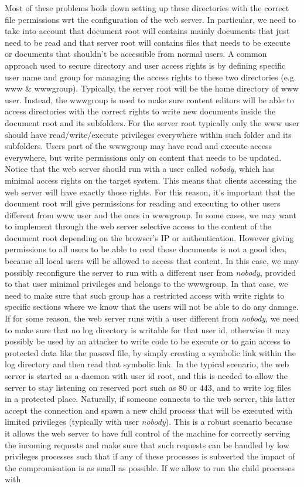Most of these problems boils down setting up these directories with the correct file permissions wrt the configuration of the web server. In particular, we need to take into account that document root will contains mainly documents that just need to be read and that server root will contains files that needs to be execute or documents that shouldn't be accessible from normal users. A common approach used to secure directory and user access rights is by defining specific user name and group for managing the access rights to these two directories (e.g. www \& wwwgroup). Typically, the server root will be the home directory of www user. Instead, the wwwgroup is used to make sure content editors will be able to access directories with the correct rights to write new documents inside the document root and its subfolders. For the server root typically only the www user should have read/write/execute privileges everywhere within such folder and its subfolders. Users part of the wwwgroup may have read and execute access everywhere, but write permissions only on content that needs to be updated. Notice that the web server should run with a user called \textit{nobody}, which has minimal access rights on the target system. This means that clients accessing the web server will have exactly those rights. For this reason, it's important that the document root will give permissions for reading and executing to other users different from www user and the ones in wwwgroup. In some cases, we may want to implement through the web server selective access to the content of the document root depending on the browser's IP or authentication. However giving permissions to all users to be able to read those documents is not a good idea, because all local users will be allowed to access that content. In this case, we may possibly reconfigure the server to run with a different user from \textit{nobody}, provided to that user minimal privileges and belongs to the wwwgroup. In that case, we need to make sure that such group has a restricted access with write rights to specific sections where we know that the users will not be able to do any damage. If for some reason, the web server runs with a user different from \textit{nobody}, we need to make sure that no log directory is writable for that user id, otherwise it may possibly be used by an attacker to write code to be execute or to gain access to protected data like the passwd file, by simply creating a symbolic link within the log directory and then read that symbolic link. In the typical scenario, the web server is started as a daemon with user id root, and this is needed to allow the server to stay listening on reserved port such as $80$ or $443$, and to write log files in a protected place. Naturally, if someone connects to the web server, this latter accept the connection and spawn a new child process that will be executed with limited privileges (typically with user \textit{nobody}). This is a robust scenario because it allows the web server to have full control of the machine for correctly serving the incoming requests and make sure that such requests can be handled by low privileges processes such that if any of these processes is subverted the impact of the compromisation is as small as possible. If we allow to run the child processes with 